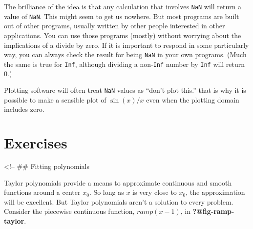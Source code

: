 \documentclass[
  letterpaper,
  DIV=11,
  numbers=noendperiod,
  oneside]{scrreprt}
\begin{document}
The brilliance of the idea is that any calculation that involves
\texttt{NaN} will return a value of \texttt{NaN}. This might seem to get
us nowhere. But most programs are built out of other programs, usually
written by other people interested in other applications. You can use
those programs (mostly) without worrying about the implications of a
divide by zero. If it is important to respond in some particularly way,
you can always check the result for being \texttt{NaN} in your own
programs. (Much the same is true for \texttt{Inf}, although dividing a
non-\texttt{Inf} number by \texttt{Inf} will return 0.)

Plotting software will often treat \texttt{NaN} values as ``don't plot
this.'' that is why it is possible to make a sensible plot of
\(\sin(x)/x\) even when the plotting domain includes zero.

\hypertarget{exercises-10}{%
\section{Exercises}\label{exercises-10}}

\textless!-- \#\# Fitting polynomials

Taylor polynomials provide a means to approximate continuous and smooth
functions around a center \(x_0\). So long as \(x\) is very close to
\(x_0\), the approximation will be excellent. But Taylor polynomials
aren't a solution to every problem. Consider the piecewise continuous
function, \(ramp(x-1)\), in \textbf{?@fig-ramp-taylor}.
\end{document}
